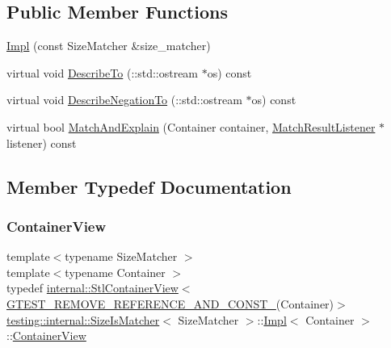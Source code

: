 \subsection*{Public Member Functions}
\begin{DoxyCompactItemize}
\item 
\hyperlink{classtesting_1_1internal_1_1_size_is_matcher_1_1_impl_aa5279c8598ec8982546350fb442223f3}{Impl} (const Size\+Matcher \&size\+\_\+matcher)
\item 
virtual void \hyperlink{classtesting_1_1internal_1_1_size_is_matcher_1_1_impl_a6b2524886e5fa751e96495a74d75b7cd}{Describe\+To} (\+::std\+::ostream $\ast$os) const
\item 
virtual void \hyperlink{classtesting_1_1internal_1_1_size_is_matcher_1_1_impl_a24b76fc2ac7b8d58cb5c7a3c5d5d35ab}{Describe\+Negation\+To} (\+::std\+::ostream $\ast$os) const
\item 
virtual bool \hyperlink{classtesting_1_1internal_1_1_size_is_matcher_1_1_impl_a5180472f5a18b8c0314ed835c52e09d4}{Match\+And\+Explain} (Container container, \hyperlink{classtesting_1_1_match_result_listener}{Match\+Result\+Listener} $\ast$listener) const
\end{DoxyCompactItemize}


\subsection{Member Typedef Documentation}
\mbox{\label{classtesting_1_1internal_1_1_size_is_matcher_1_1_impl_ae848755998eaaaa5e38366a2fc8b55e2}} 
\subsubsection{\texorpdfstring{Container\+View}{ContainerView}}
{\footnotesize\ttfamily template$<$typename Size\+Matcher $>$ \\
template$<$typename Container $>$ \\
typedef \hyperlink{classtesting_1_1internal_1_1_stl_container_view}{internal\+::\+Stl\+Container\+View}$<$ \hyperlink{gtest-internal_8h_a874567b176266188fabfffb8393267ce}{G\+T\+E\+S\+T\+\_\+\+R\+E\+M\+O\+V\+E\+\_\+\+R\+E\+F\+E\+R\+E\+N\+C\+E\+\_\+\+A\+N\+D\+\_\+\+C\+O\+N\+S\+T\+\_\+}(Container)$>$ \hyperlink{classtesting_1_1internal_1_1_size_is_matcher}{testing\+::internal\+::\+Size\+Is\+Matcher}$<$ Size\+Matcher $>$\+::\hyperlink{classtesting_1_1internal_1_1_size_is_matcher_1_1_impl}{Impl}$<$ Container $>$\+::\hyperlink{classtesting_1_1internal_1_1_size_is_matcher_1_1_impl_ae848755998eaaaa5e38366a2fc8b55e2}{Container\+View}}

